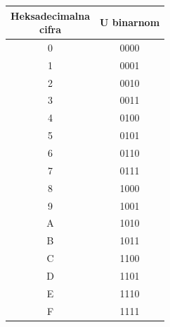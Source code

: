 \begin{tabular}{cc}\toprule
\makecell{Heksadecimalna\\cifra} & U binarnom\\\midrule
0 & 0000\\
1 & 0001\\
2 & 0010\\
3 & 0011\\
4 & 0100\\
5 & 0101\\
6 & 0110\\
7 & 0111\\
8 & 1000\\
9 & 1001\\
A & 1010\\
B & 1011\\
C & 1100\\
D & 1101\\
E & 1110\\
F & 1111\\
\bottomrule\end{tabular}

